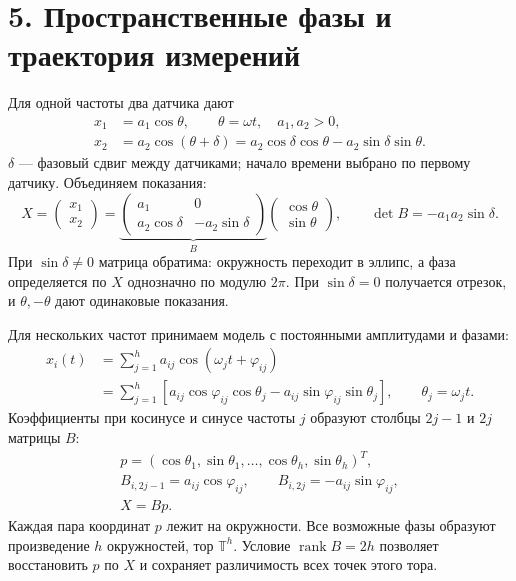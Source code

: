 \documentclass[11pt,a4paper]{article}
\begin{document}
\section*{5. Пространственные фазы и траектория измерений}
Для одной частоты два датчика дают
\begin{align*}
 x_1&=a_1\cos\theta,\qquad \theta=\omega t,\quad a_1,a_2>0,\\
 x_2&=a_2\cos(\theta+\delta)
     =a_2\cos\delta\cos\theta-a_2\sin\delta\sin\theta.
\end{align*}
$\delta$ --- фазовый сдвиг между датчиками; начало времени выбрано
по первому датчику. Объединяем показания:
\[
 X=\begin{pmatrix}x_1\\x_2\end{pmatrix}
 =\underbrace{\begin{pmatrix}a_1&0\\a_2\cos\delta&-a_2\sin\delta\end{pmatrix}}_B
 \begin{pmatrix}\cos\theta\\\sin\theta\end{pmatrix},\qquad
 \det B=-a_1a_2\sin\delta.
\]
При $\sin\delta\ne0$ матрица обратима: окружность переходит в эллипс,
а фаза определяется по $X$ однозначно по модулю $2\pi$.
При $\sin\delta=0$ получается отрезок, и $\theta,-\theta$
дают одинаковые показания.

Для нескольких частот принимаем модель с постоянными амплитудами и фазами:
\begin{align*}
 x_i(t)&=\sum_{j=1}^h a_{ij}\cos(\omega_jt+\varphi_{ij})\\
 &=\sum_{j=1}^h\left[
 a_{ij}\cos\varphi_{ij}\cos\theta_j
 -a_{ij}\sin\varphi_{ij}\sin\theta_j\right],\qquad \theta_j=\omega_jt.
\end{align*}
Коэффициенты при косинусе и синусе частоты $j$ образуют столбцы
$2j-1$ и $2j$ матрицы $B$:
\begin{gather*}
 p=(\cos\theta_1,\sin\theta_1,\ldots,\cos\theta_h,\sin\theta_h)^T,\\
 B_{i,2j-1}=a_{ij}\cos\varphi_{ij},\qquad
 B_{i,2j}=-a_{ij}\sin\varphi_{ij},\\
 X=Bp.
\end{gather*}
Каждая пара координат $p$ лежит на окружности. Все возможные фазы
образуют произведение $h$ окружностей, тор $\mathbb T^h$.
Условие $\operatorname{rank}B=2h$ позволяет восстановить $p$ по $X$
и сохраняет различимость всех точек этого тора.
\end{document}
